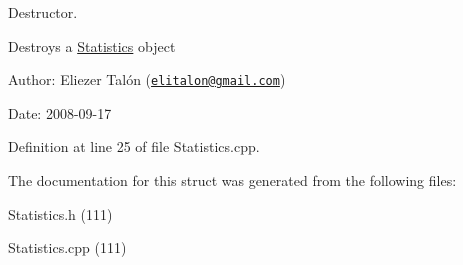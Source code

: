 Destructor. 

Destroys a \hyperlink{struct_statistics}{Statistics} object

\begin{Desc}
\item[Author:]Eliezer Talón (\href{mailto:elitalon@gmail.com}{\tt elitalon@gmail.com}) \end{Desc}
\begin{Desc}
\item[Date:]2008-09-17 \end{Desc}


Definition at line 25 of file Statistics.cpp.

The documentation for this struct was generated from the following files:\begin{CompactItemize}
\item 
Statistics.h (111)\item 
Statistics.cpp (111)\end{CompactItemize}
